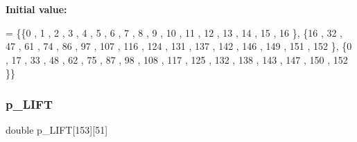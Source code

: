{\bfseries Initial value\+:}
\begin{DoxyCode}
= \{\{0 , 1 , 2 , 3 , 4 , 5 , 6 , 7 , 8 , 9 , 10 , 11 , 12 , 13 , 14 , 15 , 16 \},
\{16 , 32 , 47 , 61 , 74 , 86 , 97 , 107 , 116 , 124 , 131 , 137 , 142 , 146 , 149 , 151 , 152 \},
\{0 , 17 , 33 , 48 , 62 , 75 , 87 , 98 , 108 , 117 , 125 , 132 , 138 , 143 , 147 , 150 , 152 \}\}
\end{DoxyCode}
\mbox{\label{a00551_ac3ec959534b6b24a9118de14af3e11b5}} 
\subsubsection{\texorpdfstring{p\+\_\+\+L\+I\+FT}{p\_LIFT}}
{\footnotesize\ttfamily double p\+\_\+\+L\+I\+FT\mbox{[}153\mbox{]}\mbox{[}51\mbox{]}}

\mbox{\label{a00551_afd03dd8992d711dd9cc495b5bb329bbf}} 
